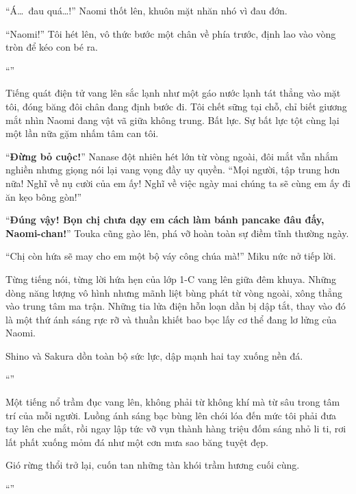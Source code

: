 \documentclass[../main.tex]{subfiles}
\begin{document}
``Á\dots\ đau quá\dots!'' Naomi thốt lên, khuôn mặt nhăn nhó vì đau đớn.

``Naomi!'' Tôi hét lên, vô thức bước một chân về phía trước, định lao vào vòng tròn để kéo con bé ra.

``''

Tiếng quát điện tử vang lên sắc lạnh như một gáo nước lạnh tát thẳng vào mặt tôi, đóng băng đôi chân đang định bước đi. Tôi chết sững tại chỗ, chỉ biết giương mắt nhìn Naomi đang vật vã giữa không trung. Bất lực. Sự bất lực tột cùng lại một lần nữa gặm nhấm tâm can tôi.

``\textbf{Đừng bỏ cuộc!}'' Nanase đột nhiên hét lớn từ vòng ngoài, đôi mắt vẫn nhắm nghiền nhưng giọng nói lại vang vọng đầy uy quyền. ``Mọi người, tập trung hơn nữa! Nghĩ về nụ cười của em ấy! Nghĩ về việc ngày mai chúng ta sẽ cùng em ấy đi ăn kẹo bông gòn!''

``\textbf{Đúng vậy! Bọn chị chưa dạy em cách làm bánh pancake đâu đấy, Naomi-chan!}'' Touka cũng gào lên, phá vỡ hoàn toàn sự điềm tĩnh thường ngày.

``Chị còn hứa sẽ may cho em một bộ váy công chúa mà!'' Miku nức nở tiếp lời.

Từng tiếng nói, từng lời hứa hẹn của lớp 1-C vang lên giữa đêm khuya. Những dòng năng lượng vô hình nhưng mãnh liệt bùng phát từ vòng ngoài, xông thẳng vào trung tâm ma trận. Những tia lửa điện hỗn loạn dần bị dập tắt, thay vào đó là một thứ ánh sáng rực rỡ và thuần khiết bao bọc lấy cơ thể đang lơ lửng của Naomi.

Shino và Sakura dồn toàn bộ sức lực, dập mạnh hai tay xuống nền đá.

``''

Một tiếng nổ trầm đục vang lên, không phải từ không khí mà từ sâu trong tâm trí của mỗi người. Luồng ánh sáng bạc bùng lên chói lóa đến mức tôi phải đưa tay lên che mắt, rồi ngay lập tức vỡ vụn thành hàng triệu đốm sáng nhỏ li ti, rơi lất phất xuống mỏm đá như một cơn mưa sao băng tuyệt đẹp.

Gió rừng thổi trở lại, cuốn tan những tàn khói trầm hương cuối cùng.

``''
\end{document}
